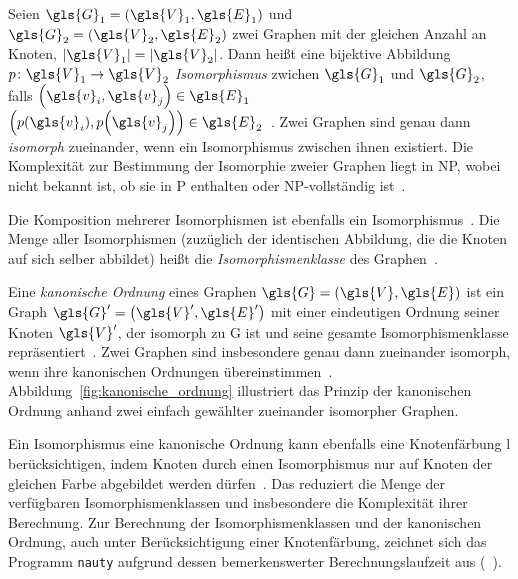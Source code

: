 Seien $\gls{G}_1 = \left(\gls{V}_1, \gls{E}_1\right)$ und $\gls{G}_2 = \left(\gls{V}_2, \gls{E}_2\right)$ zwei Graphen mit der gleichen Anzahl an Knoten, \dhe{} $\left|\gls{V}_1\right| = \left|\gls{V}_2\right|$.
Dann heißt eine bijektive Abbildung $p \colon \gls{V}_1 \to \gls{V}_2$ \emph{Isomorphismus} zwichen $\gls{G}_1$ und $\gls{G}_2$, falls $\left(\gls{v}_i, \gls{v}_j\right) \in \gls{E}_1$ \gdw{} $\left(p\left(\gls{v}_i\right), p\left(\gls{v}_j\right)\right) \in \gls{E}_2$~\cite{nauty}.
Zwei Graphen sind genau dann \emph{isomorph} zueinander, wenn ein Isomorphismus zwischen ihnen existiert.
Die Komplexität zur Bestimmung der Isomorphie zweier Graphen liegt in NP, wobei nicht bekannt ist, ob sie in P enthalten oder NP-vollständig ist~\cite{patchy}.

Die Komposition mehrerer Isomorphismen ist ebenfalls ein Isomorphismus~\cite{nauty}.
Die Menge aller Isomorphismen (zuzüglich der identischen Abbildung, die die Knoten auf sich selber abbildet) heißt die \emph{Isomorphismenklasse} des Graphen~\cite{nauty}.

Eine \emph{kanonische Ordnung} eines Graphen $\gls{G} = \left(\gls{V}, \gls{E}\right)$ ist ein Graph $\gls{G}^{\prime} = \left(\gls{V}^{\prime}, \gls{E}^{\prime}\right)$ mit einer eindeutigen Ordnung seiner Knoten $\gls{V}^{\prime}$, der isomorph zu \gls{G} ist und seine gesamte Isomorphismenklasse repräsentiert~\cite{patchy}.
Zwei Graphen sind insbesondere genau dann zueinander isomorph, wenn ihre kanonischen Ordnungen übereinstimmen~\cite{nauty}.
Abbildung~\ref{fig:kanonische_ordnung} illustriert das Prinzip der kanonischen Ordnung anhand zwei einfach gewählter zueinander isomorpher Graphen.


Ein Isomorphismus \bzw{} eine kanonische Ordnung kann ebenfalls eine Knotenfärbung \gls{l} berücksichtigen, indem Knoten durch einen Isomorphismus nur auf Knoten der gleichen Farbe abgebildet werden dürfen~\cite{nauty}.
Das reduziert die Menge der verfügbaren Isomorphismenklassen und insbesondere die Komplexität ihrer Berechnung.
Zur Berechnung der Isomorphismenklassen und der kanonischen Ordnung, auch unter Berücksichtigung einer Knotenfärbung, zeichnet sich das Programm \texttt{nauty} aufgrund dessen bemerkenswerter Berechnungslaufzeit aus (\vgl{}~\cite{nauty}).
